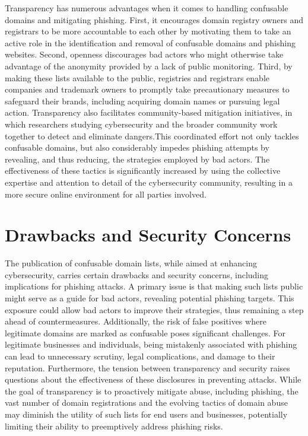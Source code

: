 Transparency has numerous advantages when it comes to handling confusable domains and mitigating phishing. First, it encourages domain registry owners and registrars to be more accountable to each other by motivating them to take an active role in the identification and removal of confusable domains and phishing websites. Second, openness discourages bad actors who might otherwise take advantage of the anonymity provided by a lack of public monitoring. Third, by making these lists available to the public, registries and registrars enable companies and trademark owners to promptly take precautionary measures to safeguard their brands, including acquiring domain names or pursuing legal action. Transparency also facilitates community-based mitigation initiatives, in which researchers studying cybersecurity and the broader community work together to detect and eliminate dangers.This coordinated effort not only tackles confusable domains, but also considerably impedes phishing attempts by revealing, and thus reducing, the strategies employed by bad actors. The effectiveness of these tactics is significantly increased by using the collective expertise and attention to detail of the cybersecurity community, resulting in a more secure online environment for all parties involved.


\section{Drawbacks and Security Concerns} 

The publication of confusable domain lists, while aimed at enhancing cybersecurity, carries certain drawbacks and security concerns, including implications for phishing attacks. A primary issue is that making such lists public might serve as a guide for bad actors, revealing potential phishing targets. This exposure could allow bad actors to improve their strategies, thus remaining a step ahead of countermeasures. Additionally, the risk of false positives where legitimate domains are marked as confusable poses significant challenges. For legitimate businesses and individuals, being mistakenly associated with phishing can lead to unnecessary scrutiny, legal complications, and damage to their reputation. Furthermore, the tension between transparency and security raises questions about the effectiveness of these disclosures in preventing attacks. While the goal of transparency is to proactively mitigate abuse, including phishing, the vast number of domain registrations and the evolving tactics of domain abuse may diminish the utility of such lists for end users and businesses, potentially limiting their ability to preemptively address phishing risks.



